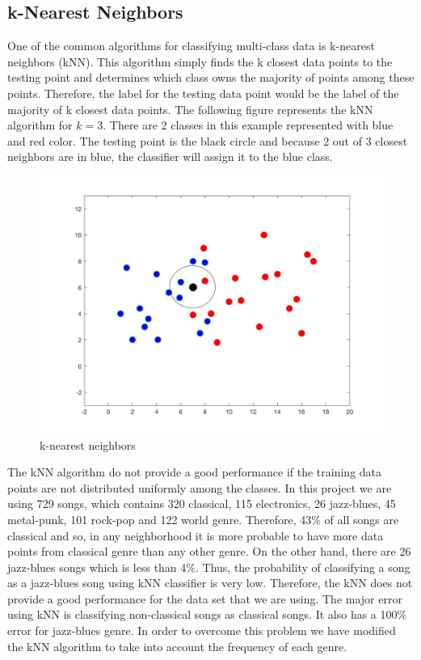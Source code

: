 \documentclass[12pt]{article}
\begin{document}
\subsection{k-Nearest Neighbors}
One of the common algorithms for classifying multi-class data is k-nearest neighbors (kNN). This algorithm simply finds the k closest data points to the testing point and determines which class owns the majority of points among these points. Therefore, the label for the testing data point would be the label of the majority of k closest data points.
The following figure represents the kNN algorithm for $k = 3$. There are 2 classes in this example represented with blue and red color. The testing point is the black circle and because 2 out of 3 closest neighbors are in blue, the classifier will assign it to the blue class.
\begin{figure}[H]\label{kNN}
	\centering
	\includegraphics[width=.8\linewidth]{kNN.jpg}
	\caption{k-nearest neighbors}
\end{figure}

The kNN algorithm do not provide a good performance if the training data points are not distributed uniformly among the classes. In this project we are using 729 songs, which contains 320 classical, 115 electronics, 26 jazz-blues, 45 metal-punk, 101 rock-pop and 122 world genre. Therefore, 43\% of all songs are classical and so, in any neighborhood it is more probable to have more data points from classical genre than any other genre. On the other hand, there are 26 jazz-blues songs which is less than 4\%. Thus, the probability of classifying a song as a jazz-blues song using kNN classifier is very low. Therefore, the kNN does not provide a good performance for the data set that we are using. The major error using kNN is classifying non-classical songs as classical songs. It also has a 100\% error for jazz-blues genre. In order to overcome this problem we have modified the kNN algorithm to take into account the frequency of each genre.
\end{document}
